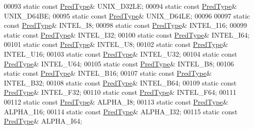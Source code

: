 \begin{DoxyCode}
00093         \textcolor{keyword}{static} \textcolor{keyword}{const} \hyperlink{class_h5_1_1_pred_type}{PredType}& UNIX\_D32LE;
00094         \textcolor{keyword}{static} \textcolor{keyword}{const} \hyperlink{class_h5_1_1_pred_type}{PredType}& UNIX\_D64BE;
00095         \textcolor{keyword}{static} \textcolor{keyword}{const} \hyperlink{class_h5_1_1_pred_type}{PredType}& UNIX\_D64LE;
00096 
00097         \textcolor{keyword}{static} \textcolor{keyword}{const} \hyperlink{class_h5_1_1_pred_type}{PredType}& INTEL\_I8;
00098         \textcolor{keyword}{static} \textcolor{keyword}{const} \hyperlink{class_h5_1_1_pred_type}{PredType}& INTEL\_I16;
00099         \textcolor{keyword}{static} \textcolor{keyword}{const} \hyperlink{class_h5_1_1_pred_type}{PredType}& INTEL\_I32;
00100         \textcolor{keyword}{static} \textcolor{keyword}{const} \hyperlink{class_h5_1_1_pred_type}{PredType}& INTEL\_I64;
00101         \textcolor{keyword}{static} \textcolor{keyword}{const} \hyperlink{class_h5_1_1_pred_type}{PredType}& INTEL\_U8;
00102         \textcolor{keyword}{static} \textcolor{keyword}{const} \hyperlink{class_h5_1_1_pred_type}{PredType}& INTEL\_U16;
00103         \textcolor{keyword}{static} \textcolor{keyword}{const} \hyperlink{class_h5_1_1_pred_type}{PredType}& INTEL\_U32;
00104         \textcolor{keyword}{static} \textcolor{keyword}{const} \hyperlink{class_h5_1_1_pred_type}{PredType}& INTEL\_U64;
00105         \textcolor{keyword}{static} \textcolor{keyword}{const} \hyperlink{class_h5_1_1_pred_type}{PredType}& INTEL\_B8;
00106         \textcolor{keyword}{static} \textcolor{keyword}{const} \hyperlink{class_h5_1_1_pred_type}{PredType}& INTEL\_B16;
00107         \textcolor{keyword}{static} \textcolor{keyword}{const} \hyperlink{class_h5_1_1_pred_type}{PredType}& INTEL\_B32;
00108         \textcolor{keyword}{static} \textcolor{keyword}{const} \hyperlink{class_h5_1_1_pred_type}{PredType}& INTEL\_B64;
00109         \textcolor{keyword}{static} \textcolor{keyword}{const} \hyperlink{class_h5_1_1_pred_type}{PredType}& INTEL\_F32;
00110         \textcolor{keyword}{static} \textcolor{keyword}{const} \hyperlink{class_h5_1_1_pred_type}{PredType}& INTEL\_F64;
00111 
00112         \textcolor{keyword}{static} \textcolor{keyword}{const} \hyperlink{class_h5_1_1_pred_type}{PredType}& ALPHA\_I8;
00113         \textcolor{keyword}{static} \textcolor{keyword}{const} \hyperlink{class_h5_1_1_pred_type}{PredType}& ALPHA\_I16;
00114         \textcolor{keyword}{static} \textcolor{keyword}{const} \hyperlink{class_h5_1_1_pred_type}{PredType}& ALPHA\_I32;
00115         \textcolor{keyword}{static} \textcolor{keyword}{const} \hyperlink{class_h5_1_1_pred_type}{PredType}& ALPHA\_I64;

\end{DoxyCode}

